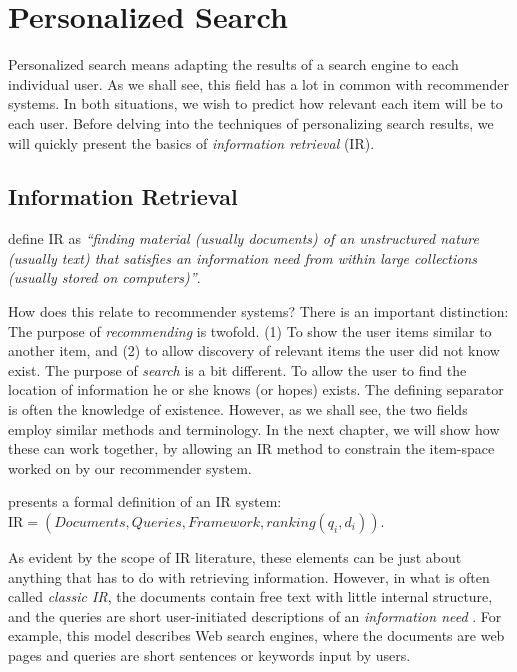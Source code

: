 \section{Personalized Search}
\label{sec:search}

Personalized search means adapting the results of a search engine to each individual user.
As we shall see, this field has a lot in common with recommender systems.
In both situations, we wish to predict how relevant each item will be to each user.
Before delving into the techniques of personalizing search results, we will quickly present 
the basics of \emph{information retrieval} (IR).

\subsection{Information Retrieval}
\label{sec:ir}

\citet[p.1]{Manning2008} define IR as \emph{``finding material (usually documents) of
an unstructured nature (usually text) that satisfies an information need
from within large collections (usually stored on computers)''}.

How does this relate to recommender systems? There is an important distinction:
The purpose of \emph{recommending} is twofold. (1) To show the user items
similar to another item, and (2) to allow discovery of relevant items the user did not know exist.
The purpose of \emph{search} is a bit different. To allow the user to find the location of
information he or she knows (or hopes) exists.
The defining separator is often the knowledge of existence.
However, as we shall see, the two fields employ similar methods and terminology. 
In the next chapter, we will show how these can work together,
by allowing an IR method to constrain the item-space worked on by our recommender system.

\citet[p.23]{Baeza-Yates1999} presents a formal definition of an IR system:
$\mathrm{IR} = (Documents, Queries, Framework, ranking(q_i, d_i))$.

As evident by the scope of IR literature, these elements can be just about anything
that has to do with retrieving information. However, in what is often called
\emph{classic IR}, the documents contain free text with little internal structure,
and the queries are short user-initiated descriptions of an \emph{information need} \citep[p.19]{Baeza-Yates1999}. 
For example, this model describes Web search engines, where the documents are web pages and
queries are short sentences or keywords input by users.

